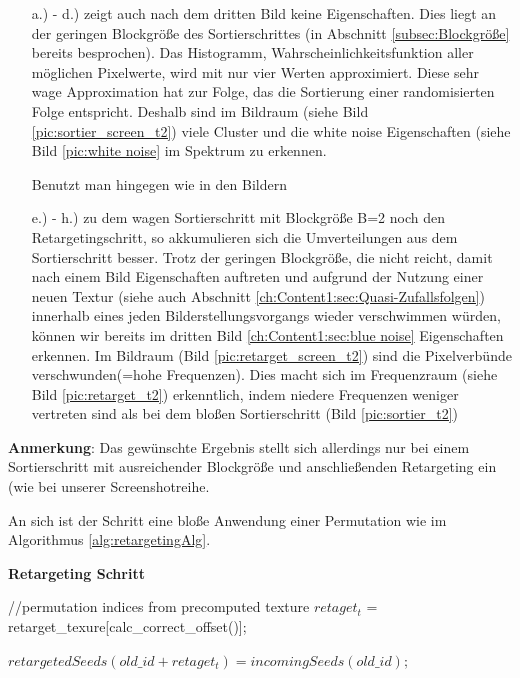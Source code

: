 \begin{itemize}
    \item[a.) - d.)] zeigt auch nach dem dritten Bild keine  Eigenschaften.
                     Dies liegt an der geringen Blockgröße des Sortierschrittes 
                     (in Abschnitt \ref{subsec:Blockgröße} bereits besprochen). Das Histogramm, Wahrscheinlichkeitsfunktion
                     aller möglichen Pixelwerte, wird mit nur vier Werten approximiert. Diese sehr wage Approximation 
                     hat zur Folge, das die Sortierung einer randomisierten Folge entspricht. Deshalb sind im Bildraum
                     (siehe Bild \ref{pic:sortier_screen_t2}) viele Cluster und die white noise Eigenschaften 
                     (siehe Bild \ref{pic:white noise} im Spektrum zu erkennen.
                     \par 
                    Benutzt man hingegen wie in den Bildern  
    \item[e.) - h.)] zu dem wagen Sortierschritt mit Blockgröße B=2 noch den Retargetingschritt, so akkumulieren sich die 
                    Umverteilungen aus dem Sortierschritt besser. Trotz der geringen Blockgröße, die nicht reicht, damit nach einem 
                    Bild  Eigenschaften auftreten und aufgrund der Nutzung einer neuen 
                    Textur (siehe auch Abschnitt \ref{ch:Content1:sec:Quasi-Zufallsfolgen}) innerhalb eines jeden 
                    Bilderstellungsvorgangs wieder verschwimmen würden, können wir bereits im dritten Bild 
                    \ref{ch:Content1:sec:blue noise} Eigenschaften erkennen. Im Bildraum (Bild \ref{pic:retarget_screen_t2})
                    sind die Pixelverbünde verschwunden(=hohe Frequenzen). Dies macht sich im Frequenzraum 
                    (siehe Bild \ref{pic:retarget_t2}) erkenntlich, indem niedere Frequenzen weniger vertreten sind 
                    als bei dem bloßen Sortierschritt (Bild \ref{pic:sortier_t2})
\end{itemize}

\textbf{Anmerkung}: Das gewünschte Ergebnis stellt sich allerdings nur bei einem Sortierschritt mit ausreichender Blockgröße und 
anschließenden Retargeting ein (wie bei unserer Screenshotreihe.

An sich ist der Schritt eine bloße Anwendung einer Permutation wie im Algorithmus \ref{alg:retargetingAlg}.

\begin{tcolorbox}
\begin{algorithm}[H]
    \caption{\textbf{Retargeting Schritt}}
    \begin{algorithmic}[1]
        \State //permutation indices from precomputed texture
        \State $retaget_{t}$ = retarget\_texure[calc\_correct\_offset()];
        
        \State $retargetedSeeds(old\_id + retaget_{t}) = incomingSeeds(old\_id);$
        
    \end{algorithmic}
    \label{alg:retargetingAlg}
\end{algorithm}
\end{tcolorbox}

